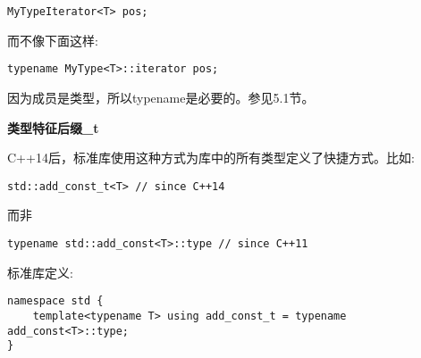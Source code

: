 \begin{lstlisting}[style=styleCXX]
MyTypeIterator<T> pos;
\end{lstlisting}

而不像下面这样:

\begin{lstlisting}[style=styleCXX]
typename MyType<T>::iterator pos;
\end{lstlisting}

\begin{tcolorbox}[colback=webgreen!5!white,colframe=webgreen!75!black]
\hspace*{0.75cm}因为成员是类型，所以typename是必要的。参见5.1节。
\end{tcolorbox}

\noindent
\textbf{类型特征后缀\_t}

C++14后，标准库使用这种方式为库中的所有类型定义了快捷方式。比如:

\begin{lstlisting}[style=styleCXX]
std::add_const_t<T> // since C++14
\end{lstlisting}

而非

\begin{lstlisting}[style=styleCXX]
typename std::add_const<T>::type // since C++11
\end{lstlisting}

标准库定义:

\begin{lstlisting}[style=styleCXX]
namespace std {
	template<typename T> using add_const_t = typename add_const<T>::type;
}
\end{lstlisting}




